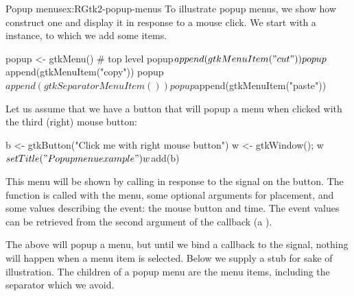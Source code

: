 \begin{example}{Popup menus}{ex:RGtk2-popup-menus}
To illustrate popup menus, we show how construct one and display it in
response to a mouse click. We start with a  instance, to
which we add some items.
\begin{Schunk}
\begin{Sinput}
 popup <- gtkMenu()                       # top level
 popup$append(gtkMenuItem("cut"))
 popup$append(gtkMenuItem("copy"))
 popup$append(gtkSeparatorMenuItem())
 popup$append(gtkMenuItem("paste"))
\end{Sinput}
\end{Schunk}

Let us assume that we have a button that will popup a menu when
clicked with the third (right) mouse button:
\begin{Schunk}
\begin{Sinput}
 b <- gtkButton("Click me with right mouse button")
 w <- gtkWindow(); w$setTitle("Popup menu example")
 w$add(b)
\end{Sinput}
\end{Schunk}

This menu will be shown by calling  in response to
the  signal on the button. The
 function is called with the menu, some
optional arguments for placement, and some values describing the
event: the mouse button and time. The event values can be retrieved from
the second argument of the callback (a ).
\begin{Schunk}
\end{Schunk}

The above will popup a menu, but until we bind a callback to the 
signal, nothing will happen when a menu item is selected. Below we
supply a stub for sake of illustration. The children of a popup menu
are the menu items, including the separator which we avoid.
\begin{Schunk}
\end{Schunk}
\end{example}

